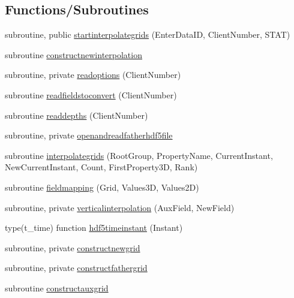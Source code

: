 \subsection*{Functions/\+Subroutines}
\begin{DoxyCompactItemize}
\item 
subroutine, public \mbox{\hyperlink{namespacemoduleinterpolategrids_af563db97a33c679a4f2a61c77a82a50f}{startinterpolategrids}} (Enter\+Data\+ID, Client\+Number, S\+T\+AT)
\item 
subroutine \mbox{\hyperlink{namespacemoduleinterpolategrids_ad2efee291ef78f4157e38ef104255bc3}{constructnewinterpolation}}
\item 
subroutine, private \mbox{\hyperlink{namespacemoduleinterpolategrids_a18ff5c4dd12a7c5ee25d5ceaf91fd501}{readoptions}} (Client\+Number)
\item 
subroutine \mbox{\hyperlink{namespacemoduleinterpolategrids_a1125f9b09e9502ada7dcfc306f876aac}{readfieldstoconvert}} (Client\+Number)
\item 
subroutine \mbox{\hyperlink{namespacemoduleinterpolategrids_a4e19db7f9940572fb986010ea9d64ec3}{readdepths}} (Client\+Number)
\item 
subroutine, private \mbox{\hyperlink{namespacemoduleinterpolategrids_ae103d8313a774b19abd42423e41be969}{openandreadfatherhdf5file}}
\item 
subroutine \mbox{\hyperlink{namespacemoduleinterpolategrids_a138eb9151410639c12869a99628fc486}{interpolategrids}} (Root\+Group, Property\+Name, Current\+Instant, New\+Current\+Instant, Count, First\+Property3D, Rank)
\item 
subroutine \mbox{\hyperlink{namespacemoduleinterpolategrids_aedd9412531395a797c1d8d210aeacfff}{fieldmapping}} (Grid, Values3D, Values2D)
\item 
subroutine, private \mbox{\hyperlink{namespacemoduleinterpolategrids_ad4787724d5952f571795f2c775d76d32}{verticalinterpolation}} (Aux\+Field, New\+Field)
\item 
type(t\+\_\+time) function \mbox{\hyperlink{namespacemoduleinterpolategrids_aa5a71ded8a9f342c24142a855b130d48}{hdf5timeinstant}} (Instant)
\item 
subroutine, private \mbox{\hyperlink{namespacemoduleinterpolategrids_a569cf42cfeb7e7bc12b2bab66c56a0b1}{constructnewgrid}}
\item 
subroutine, private \mbox{\hyperlink{namespacemoduleinterpolategrids_a1563ccf4009718586332881b09394382}{constructfathergrid}}
\item 
subroutine \mbox{\hyperlink{namespacemoduleinterpolategrids_ae09eebd1096118a9d8f6af67ad2eeb67}{constructauxgrid}}

\end{DoxyCompactItemize}

